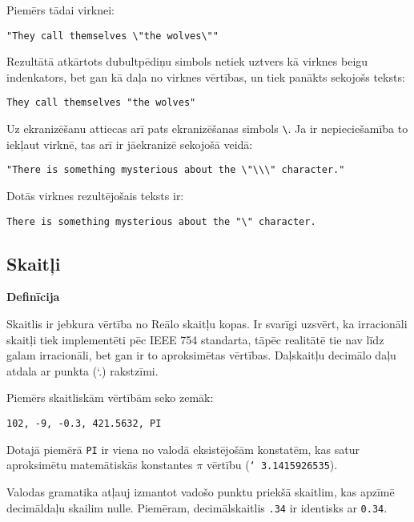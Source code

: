 \documentclass[12pt,a4paper]{report}
\begin{document}
Piemērs tādai virknei:

\begin{verbatim}
"They call themselves \"the wolves\""
\end{verbatim}

Rezultātā atkārtots dubultpēdiņu simbols netiek uztvers kā virknes beigu indenkators, bet gan kā daļa no virknes vērtības, un tiek panākts sekojošs teksts:

\begin{verbatim}
They call themselves "the wolves"
\end{verbatim}

Uz ekranizēšanu attiecas arī pats ekranizēšanas simbols \texttt{\textbackslash}. Ja ir nepieciešamība to iekļaut virknē, tas arī ir jāekranizē sekojošā veidā:

\begin{verbatim}
"There is something mysterious about the \"\\\" character."
\end{verbatim}

Dotās virknes rezultējošais teksts ir: 

\begin{verbatim}
There is something mysterious about the "\" character.
\end{verbatim}

\subsection{Skaitļi}
\textbf{Definīcija}

Skaitlis ir jebkura vērtība no Reālo skaitļu kopas. Ir svarīgi uzsvērt, ka irracionāli skaitļi tiek implementēti pēc IEEE 754 standarta, tāpēc realitātē tie nav līdz galam irracionāli, bet gan ir to aproksimētas vērtības. Daļskaitļu decimālo daļu atdala ar punkta (\char`.) rakstzīmi.

Piemērs skaitliskām vērtībām seko zemāk:

\begin{verbatim}
102, -9, -0.3, 421.5632, PI
\end{verbatim}

Dotajā piemērā \texttt{PI} ir viena no valodā eksistējošām konstatēm, kas satur aproksimētu matemātiskās konstantes $\pi$ vērtību (\texttt{\char`~3.1415926535}).

Valodas gramatika atļauj izmantot vadošo punktu priekšā skaitlim, kas apzīmē decimāldaļu skailim nulle. Piemēram, decimālskaitlis \texttt{.34} ir identisks ar \texttt{0.34}.
\end{document}
